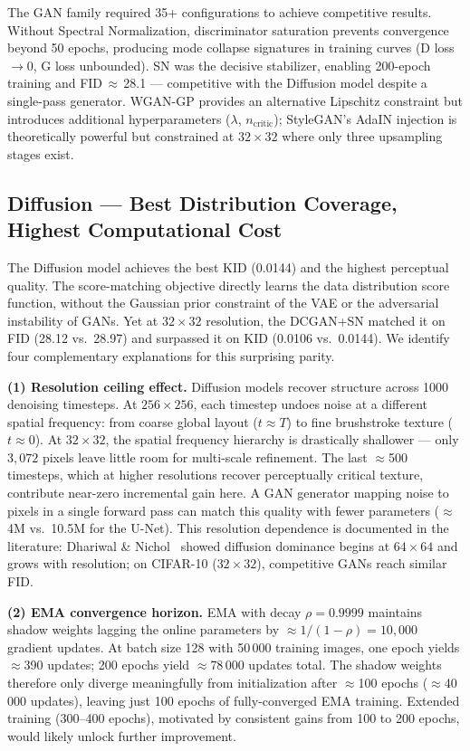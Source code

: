 \documentclass[runningheads]{llncs}
\begin{document}
The GAN family required 35+ configurations to achieve competitive results. Without Spectral Normalization, discriminator saturation prevents convergence beyond 50 epochs, producing mode collapse signatures in training curves (D loss $\to 0$, G loss unbounded). SN was the decisive stabilizer, enabling 200-epoch training and FID\,$\approx$\,28.1 — competitive with the Diffusion model despite a single-pass generator. WGAN-GP provides an alternative Lipschitz constraint but introduces additional hyperparameters ($\lambda$, $n_\text{critic}$); StyleGAN's AdaIN injection is theoretically powerful but constrained at $32{\times}32$ where only three upsampling stages exist.

\subsection{Diffusion --- Best Distribution Coverage, Highest Computational Cost}

The Diffusion model achieves the best KID (0.0144) and the highest perceptual
quality. The score-matching objective directly learns the data distribution
score function, without the Gaussian prior constraint of the VAE or the
adversarial instability of GANs. Yet at $32{\times}32$ resolution, the
DCGAN+SN matched it on FID (28.12 vs.\ 28.97) and surpassed it on KID
(0.0106 vs.\ 0.0144). We identify four complementary explanations for
this surprising parity.

\noindent\textbf{(1) Resolution ceiling effect.}
Diffusion models recover structure across 1000 denoising timesteps. At
$256{\times}256$, each timestep undoes noise at a different spatial frequency:
from coarse global layout ($t \approx T$) to fine brushstroke texture
($t \approx 0$). At $32{\times}32$, the spatial frequency hierarchy is
drastically shallower --- only $3{,}072$ pixels leave little room for
multi-scale refinement. The last $\approx$500 timesteps, which at higher
resolutions recover perceptually critical texture, contribute near-zero
incremental gain here. A GAN generator mapping noise to pixels in a single
forward pass can match this quality with fewer parameters ($\approx$4M vs.\
10.5M for the U-Net). This resolution dependence is documented in the
literature: Dhariwal \& Nichol~\cite{dhariwal2021} showed diffusion
dominance begins at $64{\times}64$ and grows with resolution; on CIFAR-10
($32{\times}32$), competitive GANs reach similar FID.

\noindent\textbf{(2) EMA convergence horizon.}
EMA with decay $\rho=0.9999$ maintains shadow weights lagging the online
parameters by $\approx 1/(1-\rho)=10{,}000$ gradient updates. At batch size
128 with 50\,000 training images, one epoch yields $\approx$390 updates;
200 epochs yield $\approx$78\,000 updates total. The shadow weights therefore
only diverge meaningfully from initialization after $\approx$100 epochs
($\approx$40\,000 updates), leaving just 100 epochs of fully-converged EMA
training. Extended training (300--400 epochs), motivated by consistent gains
from 100 to 200 epochs, would likely unlock further improvement.
\end{document}
